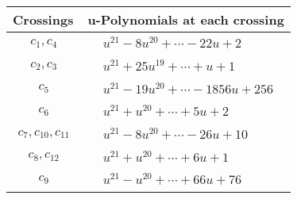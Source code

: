 \documentclass[1p]{elsarticle_modified}
\theoremstyle{definition}
\begin{document}
\begin{tabular}{m{50pt}|m{274pt}}
Crossings & \hspace{64pt}u-Polynomials at each crossing \\
\hline $$\begin{aligned}c_{1},c_{4}\end{aligned}$$&$\begin{aligned}
&u^{21}-8 u^{20}+\cdots-22 u+2
\end{aligned}$\\
\hline $$\begin{aligned}c_{2},c_{3}\end{aligned}$$&$\begin{aligned}
&u^{21}+25 u^{19}+\cdots+u+1
\end{aligned}$\\
\hline $$\begin{aligned}c_{5}\end{aligned}$$&$\begin{aligned}
&u^{21}-19 u^{20}+\cdots-1856 u+256
\end{aligned}$\\
\hline $$\begin{aligned}c_{6}\end{aligned}$$&$\begin{aligned}
&u^{21}+u^{20}+\cdots+5 u+2
\end{aligned}$\\
\hline $$\begin{aligned}c_{7},c_{10},c_{11}\end{aligned}$$&$\begin{aligned}
&u^{21}-8 u^{20}+\cdots-26 u+10
\end{aligned}$\\
\hline $$\begin{aligned}c_{8},c_{12}\end{aligned}$$&$\begin{aligned}
&u^{21}+u^{20}+\cdots+6 u+1
\end{aligned}$\\
\hline $$\begin{aligned}c_{9}\end{aligned}$$&$\begin{aligned}
&u^{21}- u^{20}+\cdots+66 u+76
\end{aligned}$\\
\hline
\end{tabular}\\~\\
\newpage\renewcommand{\arraystretch}{1}
\end{document}
